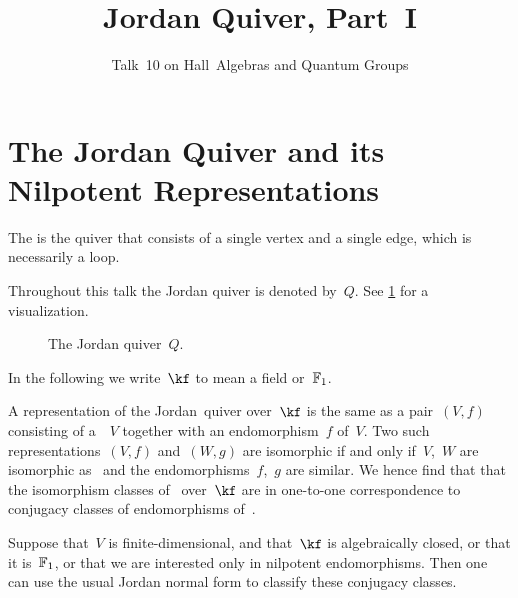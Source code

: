 \documentclass[a4paper, 11pt, twoside=semi]{scrartcl}
\title{Jordan Quiver, Part~I}
\subtitle{Talk~10 on Hall~Algebras and Quantum Groups}
\author{}
\date{}
\begin{document}
\maketitle

\vspace{-4em}





\section{The Jordan Quiver and its Nilpotent Representations}

\begin{definition}
  The  is the quiver that consists of a single vertex and a single edge, which is necessarily a loop.
\end{definition}

Throughout this talk the Jordan quiver is denoted by~$Q$.
See \cref{jordan quiver} for a visualization.
\begin{figure}[tb]
  \centering
  \caption{The Jordan quiver~$Q$.}
  \label{jordan quiver}
\end{figure}
In the following we write~$\kf$ to mean a field or~$\mathbb{F}_1$.

A representation of the Jordan~quiver over~$\kf$ is the same as a pair~$(V,f)$ consisting of a~\vectorspace{$\kf$}~$V$ together with an endomorphism~$f$ of~$V$.
Two such representations~$(V, f)$ and~$(W, g)$ are isomorphic if and only if~$V$,~$W$ are isomorphic as~\vectorspaces{$\kf$} and the endomorphisms~$f$,~$g$ are similar.
We hence find that that the isomorphism classes of~ over~$\kf$ are in one-to-one correspondence to conjugacy classes of endomorphisms of~\vectorspaces{$\kf$}.

Suppose that~$V$ is finite-dimensional, and that~$\kf$ is algebraically closed, or that it is~$\mathbb{F}_1$, or that we are interested only in nilpotent endomorphisms.
Then one can use the usual Jordan normal form to classify these conjugacy classes.
\end{document}
